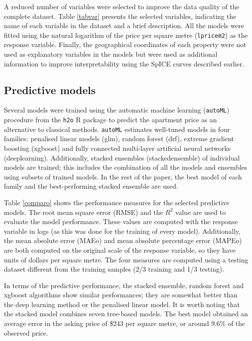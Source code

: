\documentclass[smallextended,natbib]{svjour3}\usepackage[]{graphicx}\usepackage[]{xcolor}
\begin{document}
A reduced number of variables were selected to improve the data quality of the complete dataset. Table \ref{tabvar} presents the selected variables, indicating the name of each variable in the dataset and a brief description. All the models were fitted using the natural logarithm of the  price per square metre (\texttt{lpricem2}) as the response variable. Finally, the geographical coordinates of each property were not used as explanatory variables in the models but were used as additional information to improve interpretability using the SpICE curves described earlier.
 
\subsection{Predictive models}
\label{modelo} 

Several models were trained %
using the automatic machine learning (\texttt{autoML}) procedure from the \texttt{h2o} R package \citep{h2o} to predict the apartment  price as an alternative to classical methods. \texttt{autoML} estimates well-tuned models in four families: penalised linear models (glm), random forest (drf), extreme gradient boosting (xgboost) and fully connected multi-layer artificial neural networks (deeplearning). Additionally,  stacked ensembles (stackedensemble) of individual models are trained; this includes the combination of all the models and ensembles using subsets of trained models. In the rest of the paper, the best model of each family and the best-performing stacked ensemble are used. 

Table \ref{comparo} shows the  performance measures for the selected predictive models.  The root mean square error (RMSE) and the $R^2$ value are used to evaluate the model performance. These values are computed with the response variable in logs (as this was done for the training of every model). Additionally, the mean absolute error (MAEo) and mean absolute percentage error (MAPEo) are both computed on the original scale of the response variable, so they have units of dollars per square metre.  The four measures are computed using a testing dataset different from the training samples (2/3 training and 1/3 testing). 


In terms of the predictive performance, the stacked ensemble, random forest and xgboost algorithms show similar performances; they are somewhat better than the deep learning method or the penalised linear model. It is worth noting that the stacked model combines seven tree-based models. The best model obtained an average error in the asking price of \$243 per square metre, or around 9.6\% of the observed price.  %
\end{document}
